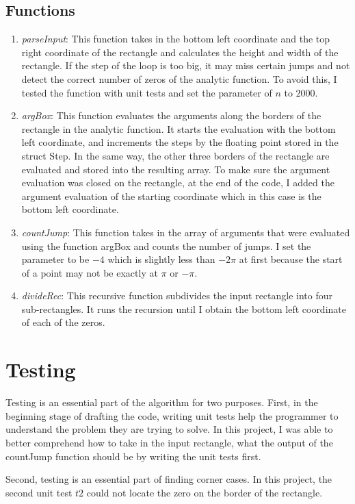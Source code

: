 \documentclass[11pt,reqno,oneside,a4paper]{article}
\begin{document}
\subsection{Functions}
	\begin{enumerate}
		\item \emph{parseInput}: 
		This function takes in the bottom left coordinate and the top right coordinate of the rectangle and calculates the height and width of the rectangle. 
		If the step of the loop is too big, it may miss certain jumps and not detect the correct number of zeros of the analytic function.
		To avoid this, I tested the function with unit tests and set the parameter of $n$ to $2000.$ 
		
		\item \emph{argBox}:
		This function evaluates the arguments along the borders of the rectangle in the analytic function. 
		It starts the evaluation with the bottom left coordinate, and increments the steps by the floating point stored in the struct Step. 
		In the same way, the other three borders of the rectangle are evaluated and stored into the resulting array. 
		To make sure the argument evaluation was closed on the rectangle, at the end of the code, I added the argument evaluation of the starting coordinate which in this case is the bottom left coordinate.
		
		\item \emph{countJump}: 
		This function takes in the array of arguments that were evaluated using the function argBox and counts the number of jumps.
		I set the parameter to be $-4$ which is slightly less than $-2\pi$ at first because the start of a point may not be exactly at $\pi$ or $-\pi.$ 
		
		\item \emph{divideRec}:
		This recursive function subdivides the input rectangle into four sub-rectangles.
		It runs the recursion until I obtain the bottom left coordinate of each of the zeros. 
		
		
	\end{enumerate}

\section{Testing}
	
Testing is an essential part of the algorithm for two purposes. 
First, in the beginning stage of drafting the code, writing unit tests help the programmer to understand the problem they are trying to solve. 
In this project, I was able to better comprehend how to take in the input rectangle, what the output of the countJump function should be by writing the unit tests first.

Second, testing is an essential part of finding corner cases. 
In this project, the second unit test $t2$ could not locate the zero on the border of the rectangle. 

	
	
	
	
	
	
	
	
	
	
	
	
	
	
	
	
	
	
	
\end{document}

